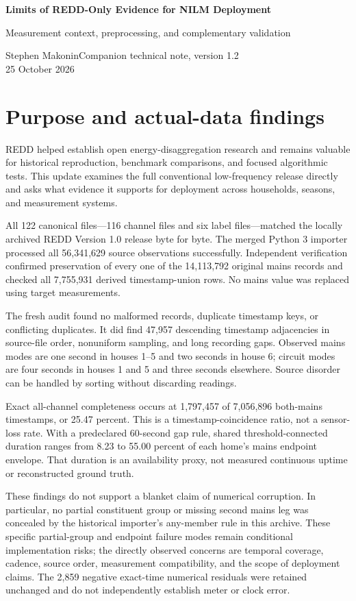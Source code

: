 \documentclass[11pt,letterpaper]{article}
\begin{document}
{\LARGE\bfseries Limits of REDD-Only Evidence for NILM Deployment\par}
\vspace{6pt}
{\large Measurement context, preprocessing, and complementary validation\par}
\vspace{5pt}
Stephen Makonin\quad Companion technical note, version 1.2\\
25 October 2026
\vspace{7pt}

\section*{Purpose and actual-data findings}
REDD helped establish open energy-disaggregation research and remains valuable for historical reproduction, benchmark comparisons, and focused algorithmic tests. This update examines the full conventional low-frequency release directly and asks what evidence it supports for deployment across households, seasons, and measurement systems. \cite{ref1,ref14}

All 122 canonical files---116 channel files and six label files---matched the locally archived REDD Version 1.0 release byte for byte. The merged Python 3 importer processed all 56,341,629 source observations successfully. Independent verification confirmed preservation of every one of the 14,113,792 original mains records and checked all 7,755,931 derived timestamp-union rows. No mains value was replaced using target measurements. \cite{ref14}

The fresh audit found no malformed records, duplicate timestamp keys, or conflicting duplicates. It did find 47,957 descending timestamp adjacencies in source-file order, nonuniform sampling, and long recording gaps. Observed mains modes are one second in houses 1--5 and two seconds in house 6; circuit modes are four seconds in houses 1 and 5 and three seconds elsewhere. Source disorder can be handled by sorting without discarding readings.

Exact all-channel completeness occurs at 1,797,457 of 7,056,896 both-mains timestamps, or 25.47 percent. This is a timestamp-coincidence ratio, not a sensor-loss rate. With a predeclared 60-second gap rule, shared threshold-connected duration ranges from 8.23 to 55.00 percent of each home's mains endpoint envelope. That duration is an availability proxy, not measured continuous uptime or reconstructed ground truth.

These findings do not support a blanket claim of numerical corruption. In particular, no partial constituent group or missing second mains leg was concealed by the historical importer's any-member rule in this archive. These specific partial-group and endpoint failure modes remain conditional implementation risks; the directly observed concerns are temporal coverage, cadence, source order, measurement compatibility, and the scope of deployment claims. The 2,859 negative exact-time numerical residuals were retained unchanged and do not independently establish meter or clock error.
\end{document}
